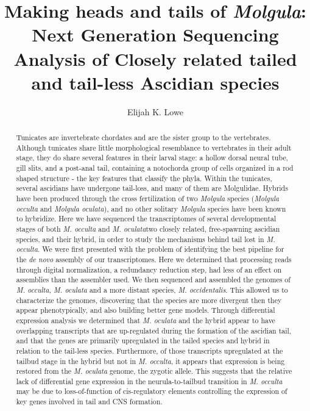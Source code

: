 \documentclass{msuphddissertation}
\author{Elijah K. Lowe} %
\title{Making heads and tails of \textit{Molgula}: Next Generation Sequencing Analysis of Closely related tailed and tail-less Ascidian species} %
\begin{document}
\maketitlepage %
\begin{abstract}
Tunicates are invertebrate chordates and are the sister group to the vertebrates. Although tunicates share little morphological resemblance to vertebrates in their adult stage, they do share several features in their larval stage: a hollow dorsal neural tube, gill slits, and a post-anal tail, containing a notochord\textemdash a group of cells organized in a rod shaped structure - the key features that classify the phyla. Within the tunicates, several ascidians have undergone tail-loss, and many of them are Molgulidae. Hybrids have been produced through the cross fertilization of two \textit{Molgula} species (\textit{Molgula occulta} and \textit{Molgula oculata}), and no other solitary \textit{Molgula} species have been known to hybridize. Here we have sequenced the transcriptomes of several developmental stages of both \textit{M. occulta} and \textit{M. oculata}\textemdash two closely related, free-spawning ascidian species, and their hybrid, in order to study the mechanisms behind tail lost in \textit{M. occulta}. We were first presented with the problem of identifying the best pipeline for the \textit{de novo} assembly of our transcriptomes. Here we determined that processing reads through digital normalization, a redundancy reduction step, had less of an effect on assemblies than the assembler used. We then sequenced and assembled the genomes of  \textit{M. occulta}, \textit{M. oculata} and a more distant species, \textit{M. occidentalis}. This allowed us to characterize the genomes, discovering that the species are more divergent then they appear phenotypically, and also building better gene models. Through differential expression analysis we determined that \textit{M. oculata} and the hybrid appear to have overlapping transcripts that are up-regulated during the formation of the ascidian tail, and that the genes are primarily upregulated in the tailed species and hybrid in relation to the tail-less species. Furthermore, of those transcripts upregulated at the tailbud stage in the hybrid but not in \textit{M. occulta}, it appears that expression is being restored from the \textit{M. oculata} genome, the zygotic allele. This suggests that the relative lack of differential gene expression in the neurula-to-tailbud transition in \textit{M. occulta} may be due to loss-of-function of cis-regulatory elements controlling the expression of key genes involved in tail and CNS formation.
\end{abstract}
\end{document}
